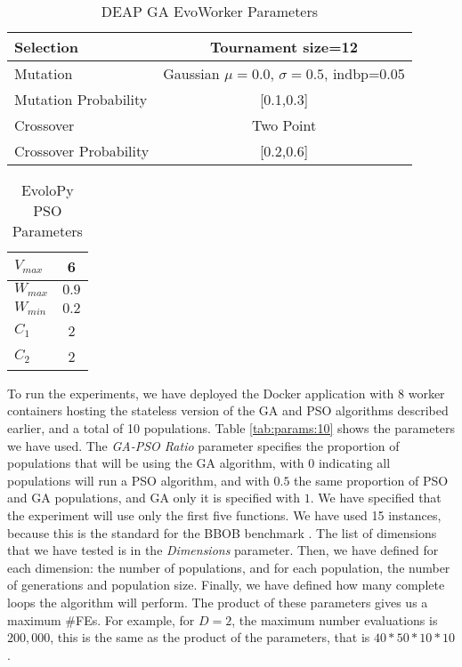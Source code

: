 \begin{table}
  \small
  \caption{ DEAP GA EvoWorker Parameters }
  \label{tab:GAparams} 
  \centering
  \small
  \begin{tabular}{|l|c|}
    \hline
    Selection & Tournament size=12                            \\ \hline
    Mutation & Gaussian $\mu=0.0$, $\sigma=0.5$, indbp=0.05   \\ \hline
    Mutation Probability & [0.1,0.3]                          \\ \hline
    Crossover & Two Point                                     \\ \hline
    Crossover Probability  & [0.2,0.6]                        \\ \hline
  \end{tabular}
\end{table}

\begin{table}
  \small
  \caption{ EvoloPy PSO Parameters }
  \label{tab:PSOparams} 
  \centering
  \small
  \begin{tabular}{|l|c|}
    \hline
    $V_{max}$ & 6 \\ \hline
    $W_{max}$ & $0.9$ \\ \hline
    $W_{min}$ & $0.2$ \\ \hline
    $C_1$ & 2 \\ \hline
    $C_2$ & 2 \\ \hline
  \end{tabular}
\end{table}

To run the experiments, we have deployed the Docker application with 8 worker
containers hosting the stateless version of the GA and PSO algorithms described
earlier, and a total of 10 populations. Table \ref{tab:params:10} shows the
parameters we have used. The {\em GA-PSO Ratio} parameter specifies the proportion 
of populations that will be using the GA algorithm, with $0$ indicating all populations
will run a PSO algorithm, and with $0.5$ the same proportion of PSO and GA populations, 
and GA only it is specified with $1$. We have specified that the experiment
will use only the first five functions. We have used 15 instances, because 
this is the standard for the BBOB benchmark \cite{hansen2016coco}.
The list of dimensions that we have tested is in the {\em Dimensions} parameter. 
Then, we have defined for each dimension: the number of populations, and for each population,
the number of generations and population size. Finally, we have defined how many complete loops the
algorithm will perform. The product of these parameters gives us a maximum
\#FEs. For example, for $D = 2$, the maximum number evaluations is $200,000$,
this is the same as the product of the parameters, that is $40*50*10*10$. 

